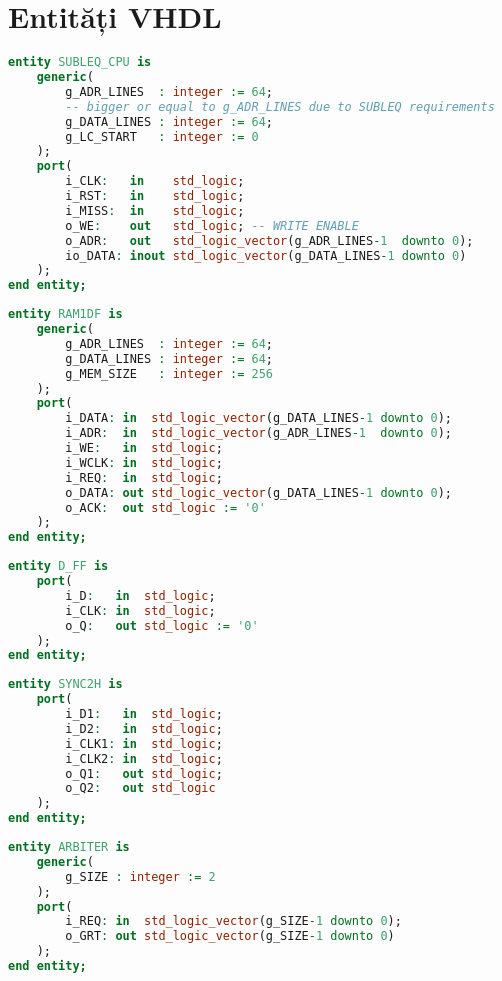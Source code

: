 \documentclass[../main.tex]{subfiles}
\begin{document}
\chapter{Entități VHDL} \label{appendix:entities}
\begin{lstlisting}[language=VHDL, caption={Entitatea procesorului}, label={lst:cpu}]
entity SUBLEQ_CPU is
	generic(
		g_ADR_LINES  : integer := 64;
		-- bigger or equal to g_ADR_LINES due to SUBLEQ requirements
		g_DATA_LINES : integer := 64;
		g_LC_START   : integer := 0
	);
	port(
		i_CLK:   in    std_logic;
		i_RST:   in    std_logic;
		i_MISS:  in    std_logic;
		o_WE:    out   std_logic; -- WRITE ENABLE
		o_ADR:   out   std_logic_vector(g_ADR_LINES-1  downto 0);
		io_DATA: inout std_logic_vector(g_DATA_LINES-1 downto 0) 
	);
end entity;
\end{lstlisting}

\begin{lstlisting}[language=VHDL, caption={Entitatea memoriei RAM}, label={lst:ram}]
entity RAM1DF is
	generic(
		g_ADR_LINES  : integer := 64;
		g_DATA_LINES : integer := 64;
		g_MEM_SIZE   : integer := 256
	);
	port(
		i_DATA: in  std_logic_vector(g_DATA_LINES-1 downto 0);
		i_ADR:  in  std_logic_vector(g_ADR_LINES-1  downto 0);
		i_WE:   in  std_logic;
		i_WCLK: in  std_logic;
		i_REQ:  in  std_logic;
		o_DATA: out std_logic_vector(g_DATA_LINES-1 downto 0);
		o_ACK:  out std_logic := '0'
	);
end entity;
\end{lstlisting}

\begin{lstlisting}[language=VHDL, caption={Entitatea bistabilului tip D}, label={lst:flipflopd}]
entity D_FF is
	port(
		i_D:   in  std_logic;
		i_CLK: in  std_logic;
		o_Q:   out std_logic := '0'
	);
end entity;
\end{lstlisting}

\begin{lstlisting}[language=VHDL, caption={Entitatea circuitului de sincronizare}, label={lst:sync}]
entity SYNC2H is
	port(
		i_D1:   in  std_logic;
		i_D2:   in  std_logic;
		i_CLK1: in  std_logic;
		i_CLK2: in  std_logic;
		o_Q1:   out std_logic;
		o_Q2:   out std_logic
	);
end entity;
\end{lstlisting}

\begin{lstlisting}[language=VHDL, caption={Entitatea arbitrului}, label={lst:arbiter}]
entity ARBITER is
	generic(
		g_SIZE : integer := 2
	);
	port(
		i_REQ: in  std_logic_vector(g_SIZE-1 downto 0);
		o_GRT: out std_logic_vector(g_SIZE-1 downto 0)
	);
end entity;
\end{lstlisting}
\end{document}
